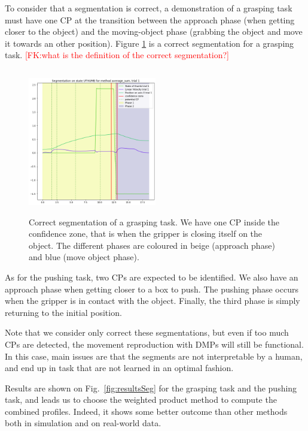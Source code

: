 \documentclass[conference]{IEEEtran}
\newcommand{\fk}[1]{\textcolor{red}{[FK:#1]}}
\begin{document}
To consider that a segmentation is correct, a demonstration of a grasping task must have one CP at the transition between the approach phase (when getting closer to the object) and the moving-object phase (grabbing the object and move it towards an other position). 
Figure \ref{fig:coloredseg} is a correct segmentation for a grasping task.
\fk{what is the definition of the correct segmentation?}

\begin{figure}[t]
  \centering
  \includegraphics[width=0.5\textwidth,height=2.5in]{img/resolSeg.png}
  \caption{Correct segmentation of a grasping task. We have one CP inside the confidence zone, that is when the gripper is closing itself on the object. The different phases are coloured in beige (approach phase) and blue (move object phase).}
  \label{fig:coloredseg}
\end{figure}

As for the pushing task, two CPs are expected to be identified. We also have an approach phase when getting closer to a box to push. The pushing phase occurs when the gripper is in contact with the object. Finally, the third phase is simply returning to the initial position.

Note that we consider only correct these segmentations, but even if too much CPs are detected, the movement reproduction with DMPs will still be functional. In this case, main issues are that the segments are not interpretable by a human, and end up in task that are not learned in an optimal fashion.


Results are shown on Fig.~\ref{fig:resultsSeg} for the grasping task and the pushing task, and leads us to choose the weighted product method to compute the combined profiles. Indeed, it shows some better outcome than other methods both in simulation and on real-world data. 
\end{document}
